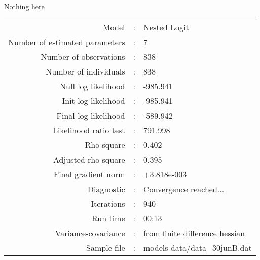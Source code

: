 Nothing here\\


\begin{flushleft}
\begin{tabular}{rcl}
\hline
Model &:& Nested Logit\\
Number of estimated parameters&:&7\\
Number of  observations &:& 838\\
Number of individuals&:&838\\
Null log likelihood&:&-985.941\\
Init log likelihood&:&-985.941\\
Final log likelihood&:&-589.942\\
Likelihood ratio test &:&791.998\\
Rho-square&:&0.402\\
Adjusted rho-square&:&0.395\\
Final gradient norm&:&+3.818e-003\\
Diagnostic&:&Convergence reached...\\
Iterations&:&940\\
Run time&:&00:13\\
Variance-covariance&:&from finite difference hessian\\
Sample file&:&models-data/data_30junB.dat\\
\end{tabular}
\end{flushleft}
